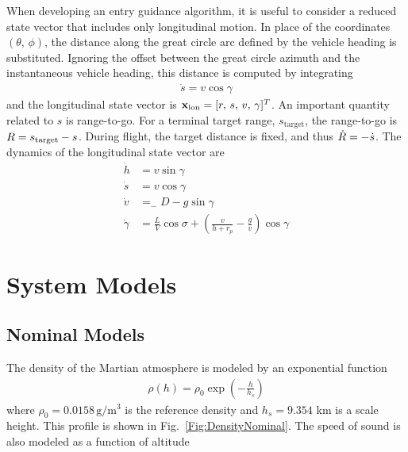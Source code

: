 When developing an entry guidance algorithm, it is useful to consider a reduced state vector that includes only longitudinal motion. In place of the coordinates $(\theta,\,\phi)$, the distance along the great circle arc defined by the vehicle heading is substituted. Ignoring the offset between the great circle azimuth and the instantaneous vehicle heading, this distance is computed by integrating
\begin{align}
	\dot{s} = v\cos\gamma
\end{align}
and the longitudinal state vector is $\mathbf{x}_{\mathrm{lon}} = [r,\,s,\,v,\,\gamma]^T$. An important quantity related to $s$ is range-to-go. For a terminal target range, $s_{\mathrm{target}}$, the range-to-go is $R=s_{\mathrm{target}}-s$. During flight, the target distance is fixed, and thus $\dot{R}=-\dot{s}$.
The dynamics of the longitudinal state vector are 
\begin{align}
	\dot{h} &= v\sin\gamma \label{Eq:dynamics:altitude:time}\\
	\dot{s} &= v\cos\gamma \\
	\dot{v} &= _-D - g\sin\gamma \label{Eq:dynamics_velocity:time}\\ 
	\dot{\gamma} &= \frac{L}{V}\cos\sigma + \left(\frac{v}{h+r_p}-\frac{g}{v}\right)\cos\gamma \label{Eq:dynamics:fpa:time}
\end{align}

\section{System Models}
\subsection{Nominal Models}
The density of the Martian atmosphere is modeled by an exponential function
\begin{align}
	\rho(h) = \rho_0\exp(-\frac{h}{h_s}) \label{Eq:Density}
\end{align}
where $\rho_0=0.0158\,\mathrm{g}/\mathrm{m}^3$ is the reference density and $h_s=9.354$ km is a scale height. This profile is shown in Fig.~\ref{Fig:DensityNominal}. The speed of sound is also modeled as a function of altitude

